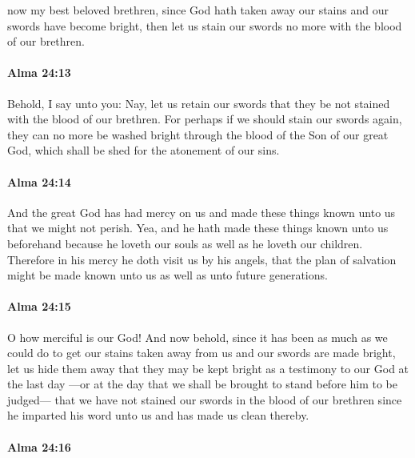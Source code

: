 			now my best beloved brethren,
			since God hath taken away our stains and our swords have become bright,
			then let us stain our swords no more with the blood of our brethren.

		\paragraph{Alma 24:13} %
			\label{ALMA-24-13}

			Behold, I say unto you:
			Nay, let us retain our swords that they be not stained with the blood of our brethren.
			For perhaps if we should stain our swords again,
			they can no more be washed bright through the blood of the Son of our great God,
			which shall be shed for the atonement of our sins.

		\paragraph{Alma 24:14} %
			\label{ALMA-24-14}

			And the great God has had mercy on us
			and made these things known unto us that we might not perish.
			Yea, and he hath made these things known unto us beforehand
			because he loveth our souls as well as he loveth our children.
			Therefore in his mercy he doth visit us by his angels,
			that the plan of salvation might be made known unto us
			as well as unto future generations.

		\paragraph{Alma 24:15} %
			\label{ALMA-24-15}

			O how merciful is our God!
			And now behold, since it has been as much as we could do
			to get our stains taken away from us and our swords are made bright,
			let us hide them away that they may be kept bright
			as a testimony to our God at the last day
			---or at the day that we shall be brought to stand before him to be judged---
			that we have not stained our swords in the blood of our brethren
			since he imparted his word unto us and has made us clean thereby.

		\paragraph{Alma 24:16} %
			\label{ALMA-24-16}

